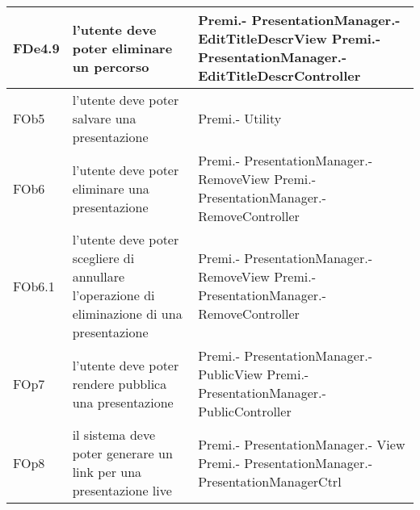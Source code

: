 \begin{longtable}{|l|p{5cm}|p{7cm}|}
\hline
FDe4.9 & l'utente deve poter eliminare un percorso & Premi.- \linebreak PresentationManager.- \linebreak EditTitleDescrView \linebreak Premi.- \linebreak PresentationManager.- \linebreak EditTitleDescrController \linebreak \\
\hline
FOb5 & l'utente deve poter salvare una presentazione & Premi.- \linebreak Utility \linebreak \\
\hline
FOb6 & l'utente deve poter eliminare una presentazione & Premi.- \linebreak PresentationManager.- \linebreak RemoveView \linebreak Premi.- \linebreak PresentationManager.- \linebreak RemoveController \linebreak \\
\hline
FOb6.1 & l'utente deve poter scegliere di annullare l'operazione di eliminazione di una presentazione & Premi.- \linebreak PresentationManager.- \linebreak RemoveView \linebreak Premi.- \linebreak PresentationManager.- \linebreak RemoveController \linebreak \\
\hline
FOp7 & l'utente deve poter rendere pubblica una presentazione & Premi.- \linebreak PresentationManager.- \linebreak PublicView \linebreak Premi.- \linebreak PresentationManager.- \linebreak PublicController \linebreak \\
\hline
FOp8 & il sistema deve poter generare un link per una presentazione live & Premi.- \linebreak PresentationManager.- \linebreak View \linebreak Premi.- \linebreak PresentationManager.- \linebreak PresentationManagerCtrl \linebreak \\

\end{longtable}
